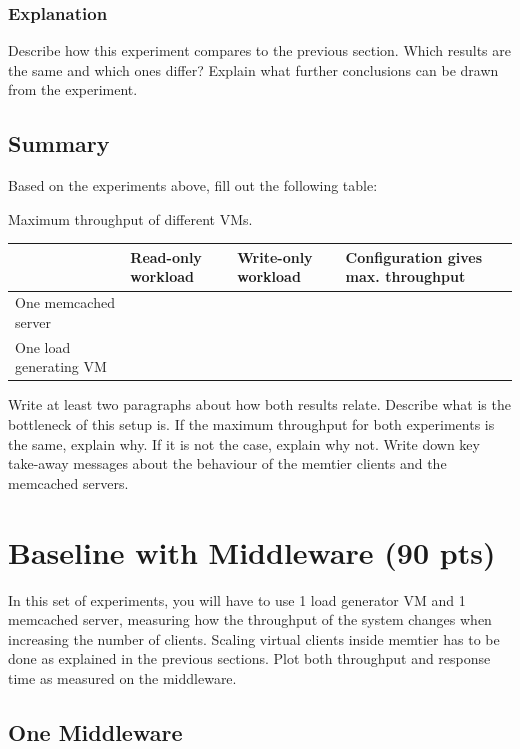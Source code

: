 \documentclass[11pt,a4paper]{article}
\begin{document}
\subsubsection{Explanation}

Describe how this experiment compares to the previous section. Which results are the same and which ones differ? Explain what further conclusions can be drawn from the experiment.


\subsection{Summary}

Based on the experiments above, fill out the following table:

\begin{center}
	{Maximum throughput of different VMs.}
	\begin{tabular}{|l|p{2cm}|p{2cm}|p{4cm}|}
		\hline                        & Read-only workload & Write-only workload & Configuration gives max. throughput \\
		\hline One memcached server   &                    &                     &                                     \\
		\hline One load generating VM &                    &                     &                                     \\
		\hline
	\end{tabular}
\end{center}


Write at least two paragraphs about how both results relate. Describe what is the bottleneck of this setup is. If the maximum throughput for both experiments is the same, explain why. If it is not the case, explain why not. Write down key take-away messages about the behaviour of the memtier clients and the memcached servers.

\section{Baseline with Middleware (90 pts)}

In this set of experiments, you will have to use 1 load generator VM and 1 memcached server, measuring how the throughput of the system changes when increasing the number of clients. Scaling virtual clients inside memtier has to be done as explained in the previous sections. Plot both throughput and response time as measured on the middleware.

\subsection{One Middleware}
\end{document}
